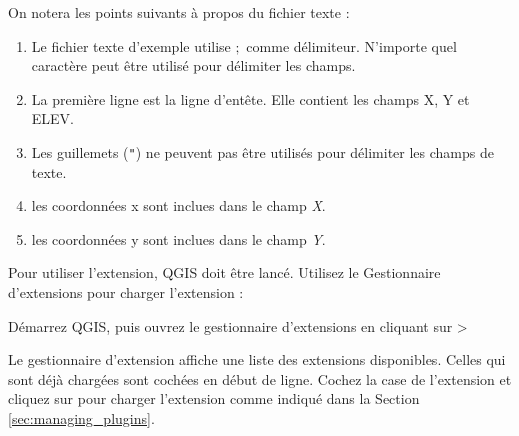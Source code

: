 On notera les points suivants \`a propos du fichier texte :

\begin{enumerate}
\item Le fichier texte d'exemple utilise \mbox{$;$} comme d\'elimiteur. N'importe quel caract\`ere peut \^etre utilis\'e pour d\'elimiter les champs.
\item La premi\`ere ligne est la ligne d'ent\^ete. Elle contient les champs X, Y et ELEV.
\item Les guillemets ({\tt{}"{}}) ne peuvent pas \^etre utilis\'es pour d\'elimiter les champs de texte.
\item les coordonn\'ees x sont inclues dans le champ {\em X}.
\item les coordonn\'ees y sont inclues dans le champ {\em Y}.
\end{enumerate}

Pour utiliser l'extension, QGIS doit \^etre lanc\'e. Utilisez le Gestionnaire d'extensions pour charger l'extension : 

D\'emarrez QGIS, puis ouvrez le gestionnaire d'extensions en cliquant sur  > 

Le gestionnaire d'extension affiche une liste des extensions disponibles.
Celles qui sont d\'ej\`a charg\'ees sont coch\'ees en d\'ebut de ligne.
Cochez la case de l'extension  et cliquez sur  pour charger l'extension comme indiqu\'e dans la Section \ref{sec:managing_plugins}.

